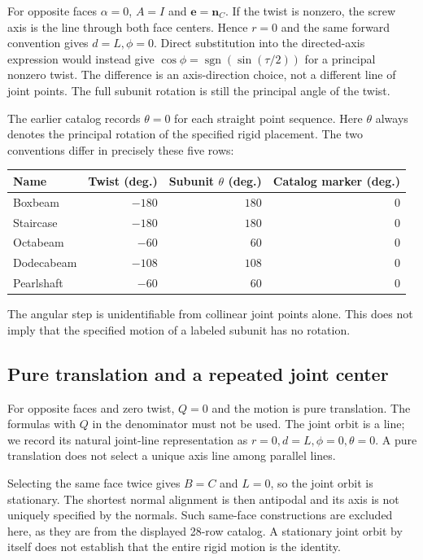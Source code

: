 \documentclass[11pt]{article}
\theoremstyle{definition}
\newcommand{\nc}{\mathbf n_C}
\newcommand{\ee}{\mathbf e}
\begin{document}
For opposite faces $\alpha=0$, $A=I$ and $\ee=\nc$. If the twist is
nonzero, the screw axis is the line through both face centers. Hence $r=0$
and the same forward convention gives $d=L,\phi=0$. Direct substitution
into the directed-axis expression would instead give
$\cos\phi=\operatorname{sgn}(\sin(\tau/2))$ for a principal nonzero twist.
The difference is an axis-direction choice, not a different line of joint
points. The full subunit rotation is still the principal angle of the twist.

The earlier catalog records $\theta=0$ for each straight point sequence.
Here $\theta$ always denotes the principal rotation of the specified rigid
placement. The two conventions differ in precisely these five rows:
\begin{center}
\renewcommand{\arraystretch}{1.3}
\begin{tabular}{@{}lrrr@{}}
\toprule
Name & Twist (deg.) & Subunit $\theta$ (deg.) & Catalog marker (deg.)\\
\midrule
Boxbeam & $-180$ & $180$ & $0$\\
Staircase & $-180$ & $180$ & $0$\\
Octabeam & $-60$ & $60$ & $0$\\
Dodecabeam & $-108$ & $108$ & $0$\\
Pearlshaft & $-60$ & $60$ & $0$\\
\bottomrule
\end{tabular}
\end{center}
The angular step is unidentifiable from collinear joint points alone. This
does not imply that the specified motion of a labeled subunit has no rotation.

\subsection{Pure translation and a repeated joint center}
For opposite faces and zero twist, $Q=0$ and the motion is pure translation.
The formulas with $Q$ in the denominator must not be used. The joint orbit
is a line; we record its natural joint-line representation as
$r=0,d=L,\phi=0,\theta=0$. A pure translation does not select a unique
axis line among parallel lines.

Selecting the same face twice gives $B=C$ and $L=0$, so the joint orbit
is stationary. The shortest normal alignment is then antipodal and its axis
is not uniquely specified by the normals. Such same-face constructions are
excluded here, as they are from the displayed 28-row catalog. A stationary
joint orbit by itself does not establish that the entire rigid motion is the
identity.
\end{document}
